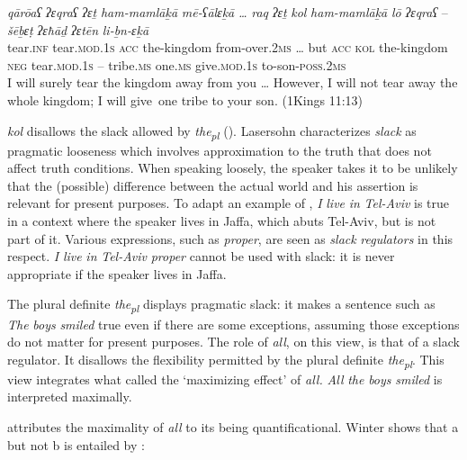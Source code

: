 \documentclass[output=paper]{langsci/langscibook}
\begin{document}
\ea%
    \label{ex:doron:23}
    \gll \textit{qārōaʕ}   \textit{ʔɛqraʕ}          \textit{ʔɛṯ}   \textit{ham-mamlāḵā}   \textit{mē-ʕālɛḵā} \textit{…} \textit{raq} \textit{ʔɛṯ}   \textit{kol}   \textit{ham-mamlāḵā} \textit{lō}      \textit{ʔɛqraʕ}          –   \textit{šēḇɛṭ}      \textit{ʔɛħāḏ}    \textit{ʔɛtēn}               \textit{li-ḇn-ɛḵā}\\
         tear.\textsc{inf}  tear.\textsc{mod.1s} \textsc{acc} the-kingdom     from-over.2\textsc{ms} \textsc{…} but \textsc{acc} \textsc{kol} the-kingdom    \textsc{neg}  tear.\textsc{mod.1s}  –   tribe\textsc{.ms} one.\textsc{ms}  give.\textsc{mod.1s}   to-son-\textsc{poss.2ms}\\
    \glt I will surely tear the kingdom away from you … However, I will not tear away the whole kingdom; I will give~one tribe to your son. (1Kings 11:13)
    \z

\textit{kol} disallows the slack allowed by \textit{the\textsubscript{pl}} (\citealt{Krifka2006,Lasersohn1999,Schwarz2013}). Lasersohn characterizes \textit{slack} as pragmatic looseness which involves approximation to the truth that does not affect truth conditions. When speaking loosely, the speaker takes it to be unlikely that the (possible) difference between the actual world and his assertion is relevant for present purposes. To adapt an example of \citet{Lauer2012}, \textit{I} \textit{live} \textit{in} \textit{Tel-Aviv} is true in a context where the speaker lives in Jaffa, which abuts Tel-Aviv, but is not part of it. Various expressions, such as \textit{proper}, are seen as \textit{slack} \textit{regulators} in this respect. \textit{I} \textit{live} \textit{in} \textit{Tel-Aviv} \textit{proper} cannot be used with slack: it is never appropriate if the speaker lives in Jaffa.

The plural definite \textit{the\textsubscript{pl}} displays pragmatic slack: it makes a sentence such as \textit{The} \textit{boys} \textit{smiled} true even if there are some exceptions, assuming those exceptions do not matter for present purposes. The role of \textit{all}, on this view, is that of a slack regulator. It disallows the flexibility permitted by the plural definite \textit{the\textsubscript{pl}}. This view integrates what \citet{Dowty1987} called the ‘maximizing effect’ of \textit{all.} \textit{All} \textit{the} \textit{boys} \textit{smiled} is interpreted maximally.

\citet{Winter2001} attributes the maximality of \textit{all} to its being quantificational. Winter shows that a but not b is entailed by :
\end{document}
